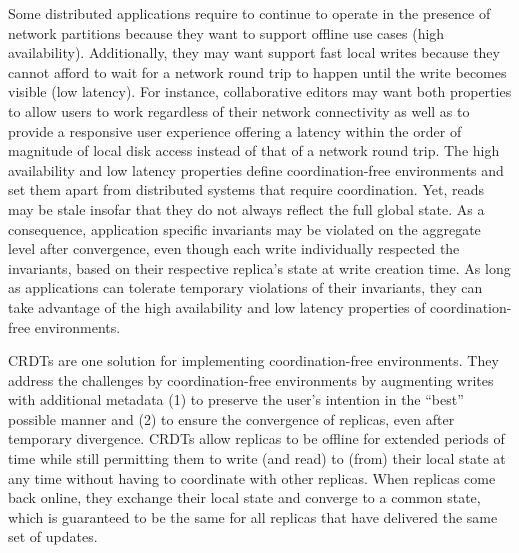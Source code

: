 Some distributed applications require to continue to operate in the presence of
network partitions because they want to support offline use cases (high availability).
Additionally, they may want support fast local writes because they cannot afford
to wait for a network round trip to happen until the write becomes
visible (low latency).
For instance, collaborative editors may want both properties to allow users
to work regardless of their network connectivity as well as to provide a
responsive user experience offering a latency within the order of magnitude
of local disk access instead of that of a network round trip.
The high availability and low latency properties define coordination-free
environments and set them apart from distributed systems that require coordination.
Yet, reads may be stale insofar that they do not always reflect the full global state.
As a consequence, application specific invariants may be violated on the aggregate
level after convergence, even though each write individually respected the invariants,
based on their respective replica's state at write creation time.
As long as applications can tolerate temporary violations of their invariants,
they can take advantage of the high availability and low latency properties
of coordination-free environments.

\acfp{CRDT}\footnotemark{} are one solution for implementing coordination-free
environments.
They address the challenges by coordination-free environments by augmenting
writes with additional metadata (1) to preserve the user's intention
in the ``best'' possible manner and (2) to ensure the convergence of replicas,
even after temporary divergence.
\acp{CRDT} allow replicas to be offline for extended periods of time
while still permitting them to write (and read) to (from) their local state
at any time without having to coordinate with other replicas.
When replicas come back online, they exchange their local state
and converge to a common state, which is guaranteed to be the same for all
replicas that have delivered the same set of updates.


